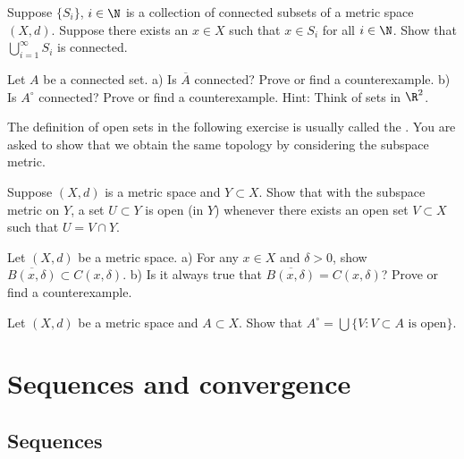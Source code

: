 \documentclass[12pt]{book}
\begin{document}
\begin{exercise}
Suppose $\{ S_i \}$, $i \in \N$
is a collection of connected subsets of a metric space $(X,d)$.
Suppose
there exists an $x \in X$ such that $x \in S_i$ for all $i \in \N$.
Show that $\bigcup_{i=1}^\infty S_i$ is connected.
\end{exercise}

\begin{exercise}
Let $A$ be a connected set.
a) \nolinebreak Is $\overline{A}$ connected?
  Prove or find a counterexample.
b) \nolinebreak Is $A^\circ$ connected?
  Prove or find a counterexample.
Hint: Think of sets in $\R^2$.
\end{exercise}

\begin{exnote}
The definition of open sets in the following exercise is usually called the
\emph{}.
You are asked to show that
we obtain the same topology by considering the subspace metric.
\end{exnote}

\begin{exercise} \label{exercise:mssubspace}
Suppose $(X,d)$ is a metric space and $Y \subset X$.
Show that
with the subspace metric on $Y$, a set $U \subset Y$
is open (in $Y$) whenever there exists an open set $V \subset X$ such
that $U = V \cap Y$.
\end{exercise}

\begin{exercise}
Let $(X,d)$ be a metric space.
a) For any $x \in X$ and $\delta > 0$, show
$\overline{B(x,\delta)} \subset C(x,\delta)$.
b) Is it always true that
$\overline{B(x,\delta)} = C(x,\delta)$?
  Prove or find a counterexample.
\end{exercise}

\begin{exercise}
Let $(X,d)$ be a metric space and $A \subset X$.
Show that
$A^\circ = \bigcup \{ V : V \subset A \text{ is open} \}$.
\end{exercise}


\sectionnewpage
\section{Sequences and convergence}
\label{sec:metseqs}


\subsection*{Sequences}
\end{document}
